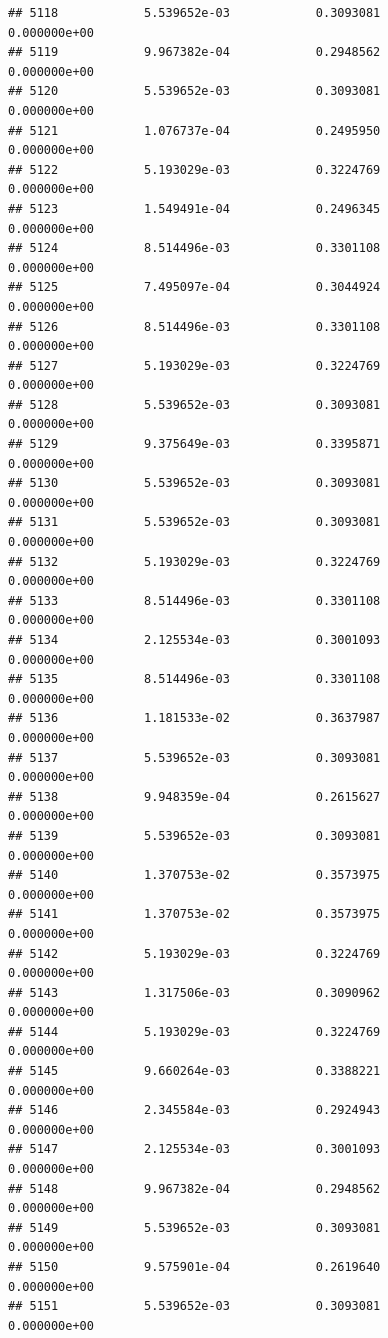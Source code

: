 \documentclass[
]{article}
\begin{document}
\begin{verbatim}
## 5118            5.539652e-03            0.3093081            0.000000e+00
## 5119            9.967382e-04            0.2948562            0.000000e+00
## 5120            5.539652e-03            0.3093081            0.000000e+00
## 5121            1.076737e-04            0.2495950            0.000000e+00
## 5122            5.193029e-03            0.3224769            0.000000e+00
## 5123            1.549491e-04            0.2496345            0.000000e+00
## 5124            8.514496e-03            0.3301108            0.000000e+00
## 5125            7.495097e-04            0.3044924            0.000000e+00
## 5126            8.514496e-03            0.3301108            0.000000e+00
## 5127            5.193029e-03            0.3224769            0.000000e+00
## 5128            5.539652e-03            0.3093081            0.000000e+00
## 5129            9.375649e-03            0.3395871            0.000000e+00
## 5130            5.539652e-03            0.3093081            0.000000e+00
## 5131            5.539652e-03            0.3093081            0.000000e+00
## 5132            5.193029e-03            0.3224769            0.000000e+00
## 5133            8.514496e-03            0.3301108            0.000000e+00
## 5134            2.125534e-03            0.3001093            0.000000e+00
## 5135            8.514496e-03            0.3301108            0.000000e+00
## 5136            1.181533e-02            0.3637987            0.000000e+00
## 5137            5.539652e-03            0.3093081            0.000000e+00
## 5138            9.948359e-04            0.2615627            0.000000e+00
## 5139            5.539652e-03            0.3093081            0.000000e+00
## 5140            1.370753e-02            0.3573975            0.000000e+00
## 5141            1.370753e-02            0.3573975            0.000000e+00
## 5142            5.193029e-03            0.3224769            0.000000e+00
## 5143            1.317506e-03            0.3090962            0.000000e+00
## 5144            5.193029e-03            0.3224769            0.000000e+00
## 5145            9.660264e-03            0.3388221            0.000000e+00
## 5146            2.345584e-03            0.2924943            0.000000e+00
## 5147            2.125534e-03            0.3001093            0.000000e+00
## 5148            9.967382e-04            0.2948562            0.000000e+00
## 5149            5.539652e-03            0.3093081            0.000000e+00
## 5150            9.575901e-04            0.2619640            0.000000e+00
## 5151            5.539652e-03            0.3093081            0.000000e+00

\end{verbatim}
\end{document}
